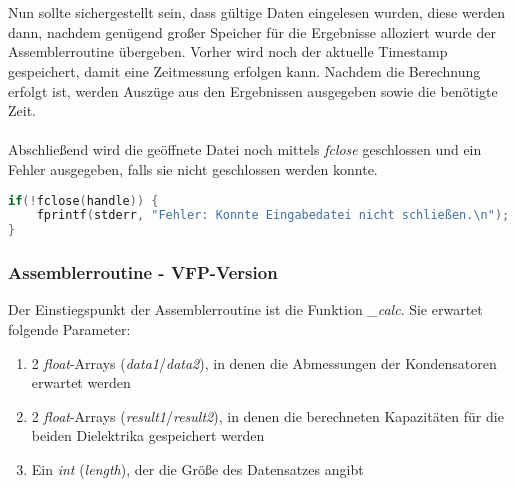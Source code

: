 \documentclass[11pt]{scrartcl}
\begin{document}
\\\\
Nun sollte sichergestellt sein, dass gültige Daten eingelesen wurden, diese werden dann, nachdem genügend großer Speicher für die Ergebnisse alloziert wurde der Assemblerroutine übergeben. Vorher wird noch der aktuelle Timestamp gespeichert, damit eine Zeitmessung erfolgen kann. Nachdem die Berechnung erfolgt ist, werden Auszüge aus den Ergebnissen ausgegeben sowie die benötigte Zeit.
\\\\
Abschließend wird die geöffnete Datei noch mittels \emph{fclose} geschlossen und ein Fehler ausgegeben, falls sie nicht geschlossen werden konnte.
\begin{lstlisting}[language=C]
if(!fclose(handle)) {
	fprintf(stderr, "Fehler: Konnte Eingabedatei nicht schließen.\n");
}
\end{lstlisting}

\subsubsection{Assemblerroutine - VFP-Version}
Der Einstiegspunkt der Assemblerroutine ist die Funktion \emph{\_calc}. Sie erwartet folgende Parameter:
\begin{enumerate}
\item 2 \emph{float}-Arrays (\emph{data1}/\emph{data2}), in denen die Abmessungen der Kondensatoren erwartet werden
\item 2 \emph{float}-Arrays (\emph{result1}/\emph{result2}), in denen die berechneten Kapazitäten für die beiden Dielektrika gespeichert werden
\item Ein \emph{int} (\emph{length}), der die Größe des Datensatzes angibt
\end{enumerate}
\end{document}
